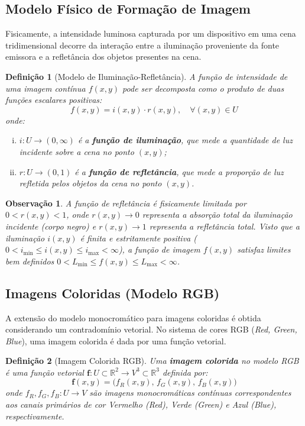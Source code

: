 \documentclass[a4paper,12pt]{report}
\newtheorem{Defini}{\bf Definição}
\newtheorem{Obs}{\bf Observação}
\begin{document}
\subsection{Modelo Físico de Formação de Imagem}

Fisicamente, a intensidade luminosa capturada por um dispositivo em uma cena tridimensional decorre da interação entre a iluminação proveniente da fonte emissora e a refletância dos objetos presentes na cena.

\begin{Defini}[Modelo de Iluminação-Refletância]
A função de intensidade de uma imagem contínua $f(x,y)$ pode ser decomposta como o produto de duas funções escalares positivas:
\begin{equation}
f(x,y) = i(x,y) \cdot r(x,y), \quad \forall (x,y) \in U
\end{equation}
onde:
\begin{enumerate}[(i)]
	\item $i: U \to (0, \infty)$ é a \textbf{função de iluminação}, que mede a quantidade de luz incidente sobre a cena no ponto $(x,y)$;
	\item $r: U \to (0, 1)$ é a \textbf{função de refletância}, que mede a proporção de luz refletida pelos objetos da cena no ponto $(x,y)$.
\end{enumerate}
\end{Defini}

\begin{Obs}
A função de refletância é fisicamente limitada por $0 < r(x,y) < 1$, onde $r(x,y) \to 0$ representa a absorção total da iluminação incidente (corpo negro) e $r(x,y) \to 1$ representa a refletância total. Visto que a iluminação $i(x,y)$ é finita e estritamente positiva ($0 < i_{\min} \le i(x,y) \le i_{\max} < \infty$), a função de imagem $f(x,y)$ satisfaz limites bem definidos $0 < L_{\min} \le f(x,y) \le L_{\max} < \infty$.
\end{Obs}

\subsection{Imagens Coloridas (Modelo RGB)}

A extensão do modelo monocromático para imagens coloridas é obtida considerando um contradomínio vetorial. No sistema de cores RGB (\textit{Red, Green, Blue}), uma imagem colorida é dada por uma função vetorial.

\begin{Defini}[Imagem Colorida RGB]
Uma \textbf{imagem colorida} no modelo RGB é uma função vetorial $\mathbf{f}: U \subset \mathbb{R}^2 \to V^3 \subset \mathbb{R}^3$ definida por:
\begin{equation}
\mathbf{f}(x,y) = \big(f_R(x,y), \, f_G(x,y), \, f_B(x,y)\big)
\end{equation}
onde $f_R, f_G, f_B: U \to V$ são imagens monocromáticas contínuas correspondentes aos canais primários de cor Vermelho (\textit{Red}), Verde (\textit{Green}) e Azul (\textit{Blue}), respectivamente.
\end{Defini}
\end{document}
